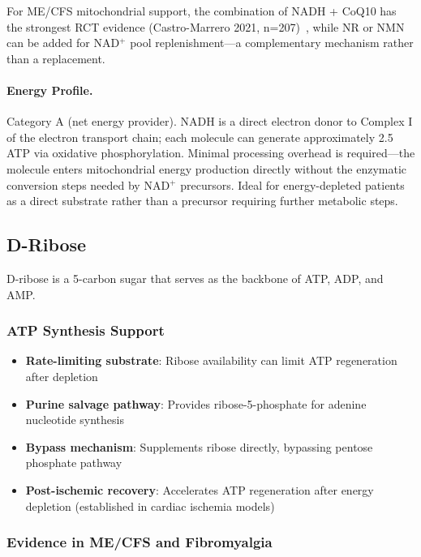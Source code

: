 For ME/CFS mitochondrial support, the combination of NADH + CoQ10 has the strongest RCT evidence (Castro-Marrero 2021, n=207)~\cite{CastroMarrero2021fatigue}, while NR or NMN can be added for NAD$^+$ pool replenishment---a complementary mechanism rather than a replacement.

\paragraph{Energy Profile.}
Category A (net energy provider). NADH is a direct electron donor to Complex I of the electron transport chain; each molecule can generate approximately 2.5 ATP via oxidative phosphorylation. Minimal processing overhead is required---the molecule enters mitochondrial energy production directly without the enzymatic conversion steps needed by NAD$^+$ precursors. Ideal for energy-depleted patients as a direct substrate rather than a precursor requiring further metabolic steps.

\subsection{D-Ribose}

D-ribose is a 5-carbon sugar that serves as the backbone of ATP, ADP, and AMP.

\subsubsection{ATP Synthesis Support}

\begin{itemize}
    \item \textbf{Rate-limiting substrate}: Ribose availability can limit ATP regeneration after depletion
    \item \textbf{Purine salvage pathway}: Provides ribose-5-phosphate for adenine nucleotide synthesis
    \item \textbf{Bypass mechanism}: Supplements ribose directly, bypassing pentose phosphate pathway
    \item \textbf{Post-ischemic recovery}: Accelerates ATP regeneration after energy depletion (established in cardiac ischemia models)
\end{itemize}

\subsubsection{Evidence in ME/CFS and Fibromyalgia}

